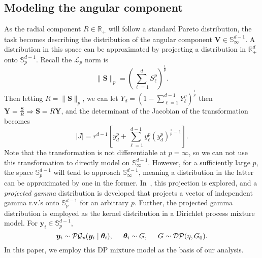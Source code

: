 \subsection{Modeling the angular component}
As the radial component $R \in {\mathbb R}_+$ will follow a standard Pareto 
    distribution, the task becomes describing the distribution of the angular component 
    $\bm{V}\in {\mathbb S}_{\infty}^{d-1}$.  A distribution in this space can be
    approximated by projecting a distribution in $\mathbb{R}_+^d$ onto $\mathbb{S}_{p}^{d-1}$.
    Recall the $\mathcal{L}_p$ norm is 
    \[
        \lVert \bm{S} \rVert_p = \left(\sum_{\ell = 1}^d S_{\ell}^p\right)^{\frac{1}{p}}.
    \]
    Then letting $R = \lVert \bm{S}\rVert_p$, we can let 
    $Y_d = \left(1 - \sum_{\ell = 1}^{d-1}Y_{\ell}^{p}\right)^{\frac{1}{p}}$ then $\bm{Y} = \frac{\bm{S}}{R}\Rightarrow \bm{S} = R\bm{Y}$, 
    and the determinant of the Jacobian of the transformation becomes
    \[
        \lvert J \rvert = r^{d-1}\left[y_d^p + \sum_{\ell = 1}^{d-1}y_{\ell}^p\left(y_d^p\right)^{\frac{1}{p} - 1} \right].
    \]
    Note that the transformation is not differentiable at $p = \infty$, so we can not use this 
    transformation to directly model on ${\mathbb S}_{\infty}^{d-1}$.
    However, for a sufficiently large $p$, the space ${\mathbb S}_p^{d-1}$ will tend
    to approach $\mathbb{S}_{\infty}^{d-1}$, meaning a distribution in the latter can be 
    approximated by one in the former.  In~\cite{trubey:pg}, this projection is explored, and
    a \emph{projected gamma} distribution is developed that projects a vector of independent gamma r.v.'s 
    onto $\mathbb{S}_{p}^{d-1}$ for an arbitrary $p$.  Further, the projected gamma distribution is
    employed as the kernel distribution in a Dirichlet process mixture model.  For $\bm{y}_i\in \mathbb{S}_{p}^{d-1}$,
    \[
        \bm{y}_i \sim \mathcal{PG}_{p}(\bm{y}_i\mid\bm{\theta}_i),\hspace{0.5cm}\bm{\theta}_i\sim G,\hspace{0.5cm}G\sim \mathcal{DP}(\eta, G_0).
    \]
    In this paper, we employ this DP mixture model as the basis of our analysis.



